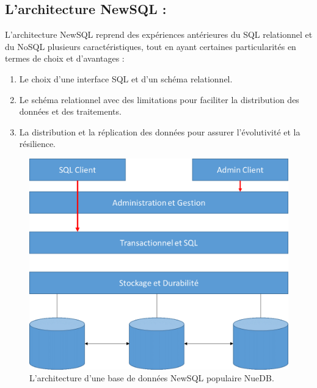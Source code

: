 \subsection{L’architecture NewSQL :}
L’architecture NewSQL reprend des expériences antérieures du SQL relationnel et du NoSQL plusieurs caractéristiques, tout en ayant certaines particularités en termes de choix et d’avantages : 
\begin{enumerate}
\item Le choix d’une interface SQL et d’un schéma relationnel. 
\item Le schéma relationnel avec des limitations pour faciliter la distribution des données et des traitements. 
\item La distribution et la réplication des données pour assurer l’évolutivité et la résilience. 
\end{enumerate}

\begin{figure}[h]
	\centering
    \includegraphics[scale=0.5]{img/4.14}
    \caption{L'architecture d'une base de données NewSQL populaire NueDB.}
\end{figure}

